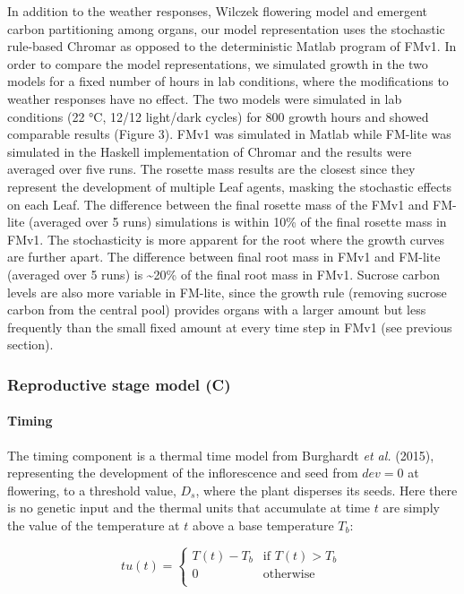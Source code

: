 \documentclass[phd]{infthesis}
\begin{document}
In addition to the weather responses, Wilczek flowering model and
emergent carbon partitioning among organs, our model representation uses
the stochastic rule-based Chromar as opposed to the deterministic Matlab
program of FMv1. In order to compare the model representations, we
simulated growth in the two models for a fixed number of hours in lab
conditions, where the modifications to weather responses have no effect.
The two models were simulated in lab conditions (22 °C, 12/12 light/dark
cycles) for \(800\) growth hours and showed comparable results (Figure
3). FMv1 was simulated in Matlab while FM-lite was simulated in the
Haskell implementation of Chromar and the results were averaged over
five runs. The rosette mass results are the closest since they represent
the development of multiple Leaf agents, masking the stochastic effects
on each Leaf. The difference between the final rosette mass of the FMv1
and FM-lite (averaged over 5 runs) simulations is within 10\% of the
final rosette mass in FMv1. The stochasticity is more apparent for the
root where the growth curves are further apart. The difference between
final root mass in FMv1 and FM-lite (averaged over 5 runs) is
\textasciitilde{}20\% of the final root mass in FMv1. Sucrose carbon
levels are also more variable in FM-lite, since the growth rule
(removing sucrose carbon from the central pool) provides organs with a
larger amount but less frequently than the small fixed amount at every
time step in FMv1 (see previous section).

\subsubsection{Reproductive stage model
  (C)}
\label{reproductive-stage-model-c}

\paragraph{Timing}
\label{timing-1}

The timing component is a thermal time model from Burghardt \emph{et
al.} (2015), representing the development of the inflorescence and seed
from \(dev = 0\) at flowering, to a threshold value, \(D_{s}\), where
the plant disperses its seeds. Here there is no genetic input and the
thermal units that accumulate at time \(t\) are simply the value of the
temperature at \(t\) above a base temperature \(T_{b}\):

\[tu(t) = \left\{ \begin{matrix}
T(t) - T_{b} & \text{if\ }T(t) > T_{b} \\
0 & \text{otherwise} \\
\end{matrix} \right.\ \]
\end{document}
